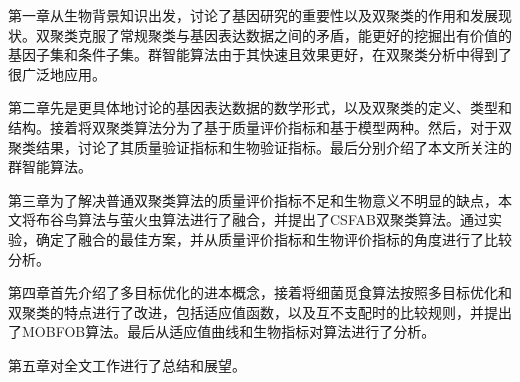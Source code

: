     第一章从生物背景知识出发，讨论了基因研究的重要性以及双聚类的作用和发展现状。双聚类克服了常规聚类与基因表达数据之间的矛盾，能更好的挖掘出有价值的基因子集和条件子集。群智能算法由于其快速且效果更好，在双聚类分析中得到了很广泛地应用。

    第二章先是更具体地讨论的基因表达数据的数学形式，以及双聚类的定义、类型和结构。接着将双聚类算法分为了基于质量评价指标和基于模型两种。然后，对于双聚类结果，讨论了其质量验证指标和生物验证指标。最后分别介绍了本文所关注的群智能算法。

    第三章为了解决普通双聚类算法的质量评价指标不足和生物意义不明显的缺点，本文将布谷鸟算法与萤火虫算法进行了融合，并提出了CSFAB双聚类算法。通过实验，确定了融合的最佳方案，并从质量评价指标和生物评价指标的角度进行了比较分析。

    第四章首先介绍了多目标优化的进本概念，接着将细菌觅食算法按照多目标优化和双聚类的特点进行了改进，包括适应值函数，以及互不支配时的比较规则，并提出了MOBFOB算法。最后从适应值曲线和生物指标对算法进行了分析。
    
    第五章对全文工作进行了总结和展望。
